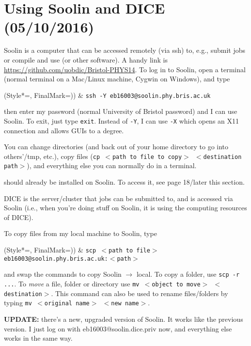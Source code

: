 \newpage
\chapter{Using Soolin and DICE (05/10/2016)}
\label{sec:usingsoolindice}

Soolin is a computer that can be accessed remotely (via ssh) to, e.g., submit jobs or compile and use \ROOT (or other software). A handy link is \url{https://github.com/uobdic/Bristol-PHYS14}. To log in to Soolin, open a terminal (normal terminal on a Mac/Linux machine, Cygwin on Windows), and type

\begin{easylist}
\ListProperties(Style*=, FinalMark={)})
& \texttt{ssh -Y eb16003{@}soolin.phy.bris.ac.uk}
\end{easylist}

then enter my password (normal University of Bristol password) and I can use Soolin. To exit, just type \texttt{exit}. Instead of \texttt{-Y}, I can use \texttt{-X} which opens an X11 connection and allows GUIs to a degree.

You can change directories (and back out of your home directory to go into others'/tmp, etc.), copy files (\texttt{cp $<$path to file to copy$>$ $<$destination path$>$}), and everything else you can normally do in a terminal.

\ROOT should already be installed on Soolin. To access it, see page 18/later this section.

DICE is the server/cluster that jobs can be submitted to, and is accessed via Soolin (i.e., when you're doing stuff on Soolin, it is using the computing resources of DICE).

To copy files from my local machine to Soolin, type

\begin{easylist}
\ListProperties(Style*=, FinalMark={)})
& \texttt{scp $<$path to file$>$ eb16003@soolin.phy.bris.ac.uk:$<$path$>$}
\end{easylist}

and swap the commands to copy Soolin $\rightarrow$ local. To copy a folder, use \texttt{scp -r ...}. To \emph{move} a file, folder or directory use \texttt{mv $<$object to move$>$ $<$destination$>$}. This command can also be used to rename files/folders by typing \texttt{mv $<$original name$>$ $<$new name$>$}.

\textbf{UPDATE:} there's a new, upgraded version of Soolin. It works like the previous version. I just log on with eb16003@soolin.dice.priv now, and everything else works in the same way.

